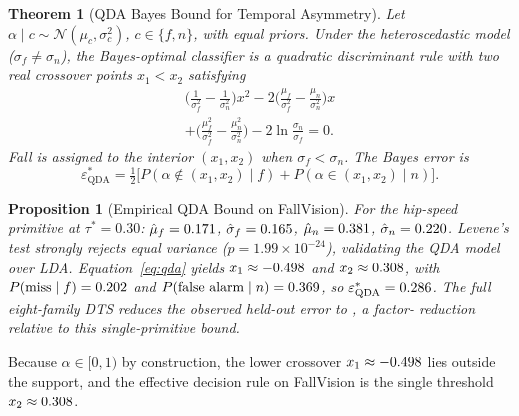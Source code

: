 \documentclass[letterpaper]{article}
\newtheorem{theorem}{Theorem}
\newtheorem{proposition}{Proposition}
\begin{document}
\begin{theorem}[QDA Bayes Bound for Temporal Asymmetry]
Let $\alpha \mid c \sim \mathcal{N}(\mu_c, \sigma_c^2)$, $c \in \{f, n\}$, with equal priors. Under the heteroscedastic model ($\sigma_f \neq \sigma_n$), the Bayes-optimal classifier is a quadratic discriminant rule with two real crossover points $x_1 < x_2$ satisfying
\begin{multline}
\Big(\tfrac{1}{\sigma_f^2}-\tfrac{1}{\sigma_n^2}\Big)x^2
- 2\Big(\tfrac{\mu_f}{\sigma_f^2}-\tfrac{\mu_n}{\sigma_n^2}\Big)x \\
+ \Big(\tfrac{\mu_f^2}{\sigma_f^2}-\tfrac{\mu_n^2}{\sigma_n^2}\Big) - 2\ln\tfrac{\sigma_n}{\sigma_f} = 0.
\label{eq:qda}
\end{multline}
Fall is assigned to the interior $(x_1, x_2)$ when $\sigma_f < \sigma_n$. The Bayes error is
\begin{equation}
\varepsilon^*_{\mathrm{QDA}} = \tfrac{1}{2}\big[P(\alpha \notin (x_1,x_2) \mid f) + P(\alpha \in (x_1,x_2) \mid n)\big].
\end{equation}
\end{theorem}

\begin{proposition}[Empirical QDA Bound on FallVision]
For the hip-speed primitive at $\tau^* = 0.30$: $\hat{\mu}_f = 0.171$, $\hat{\sigma}_f = 0.165$, $\hat{\mu}_n = 0.381$, $\hat{\sigma}_n = 0.220$. Levene's test strongly rejects equal variance ($p = 1.99{\times}10^{-24}$), validating the QDA model over LDA. Equation~\eqref{eq:qda} yields $x_1 \approx -0.498$ and $x_2 \approx 0.308$, with $P(\mathrm{miss} \mid f) = 0.202$ and $P(\mathrm{false\ alarm} \mid n) = 0.369$, so $\varepsilon^*_{\mathrm{QDA}} = 0.286$. The full eight-family DTS reduces the observed held-out error to \hgberr, a factor-\gapfactor{} reduction relative to this single-primitive bound.
\end{proposition}

Because $\alpha \in [0,1)$ by construction, the lower crossover $x_1 \approx -0.498$ lies outside the support, and the effective decision rule on FallVision is the single threshold $x_2 \approx 0.308$.
\end{document}
